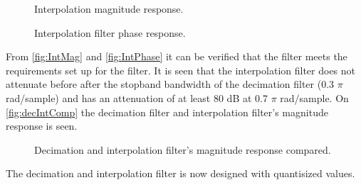 \begin{figure}[H]
	\centering
	
	\caption{Interpolation magnitude response.}
	\label{fig:IntMag}
\end{figure}

\begin{figure}[H]
	\centering
	
	\caption{Interpolation filter phase response.}
	\label{fig:IntPhase}
\end{figure}

From \autoref{fig:IntMag} and \autoref{fig:IntPhase} it can be verified that the filter meets the requirements set up for the filter. It is seen that the interpolation filter does not attenuate before after the stopband bandwidth of the decimation filter (0.3 $\pi$ rad/sample) and has an attenuation of at least 80 dB at 0.7 $\pi$ rad/sample. On \autoref{fig:decIntComp} the decimation filter and interpolation filter's magnitude response is seen.  

\begin{figure}[H]
	\centering
	
	\caption{Decimation and interpolation filter's magnitude response compared.}
	\label{fig:decIntComp}
\end{figure}

The decimation and interpolation filter is now designed with quantisized values. %